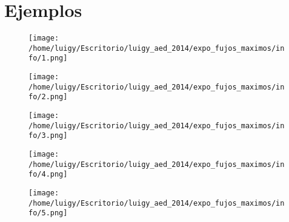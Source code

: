 \documentclass{beamer}
\begin{document}

      
\section{Ejemplos}

	\begin{frame}
	  \begin{figure}
	    \texttt{[image: /home/luigy/Escritorio/luigy\_aed\_2014/expo\_fujos\_maximos/info/1.png]}
	  \end{figure}
	\end{frame}

    \begin{frame}
	  \begin{figure}
	    \texttt{[image: /home/luigy/Escritorio/luigy\_aed\_2014/expo\_fujos\_maximos/info/2.png]}
	  \end{figure}
	\end{frame}

    \begin{frame}
	  \begin{figure}
	    \texttt{[image: /home/luigy/Escritorio/luigy\_aed\_2014/expo\_fujos\_maximos/info/3.png]}
	  \end{figure}
	\end{frame}

    \begin{frame}
	  \begin{figure}
	    \texttt{[image: /home/luigy/Escritorio/luigy\_aed\_2014/expo\_fujos\_maximos/info/4.png]}
	  \end{figure}
	\end{frame}

    \begin{frame}
	  \begin{figure}
	    \texttt{[image: /home/luigy/Escritorio/luigy\_aed\_2014/expo\_fujos\_maximos/info/5.png]}
	  \end{figure}
	\end{frame}
\end{document}
